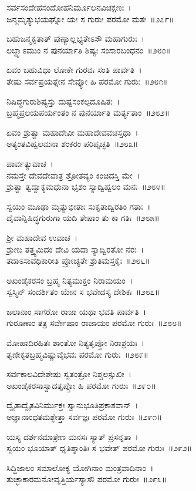 ಸರ್ವಸಂದೇಹಸಂದೋಹನಿರ್ಮೂಲನವಿಚಕ್ಷಣಃ~।\\
ಜನ್ಮಮೃತ್ಯುಭಯಘ್ನೋ ಯಃ ಸ ಗುರುಃ ಪರಮೋ ಮತಃ~॥೨೭೯॥

ಬಹುಜನ್ಮಕೃತಾತ್ ಪುಣ್ಯಾಲ್ಲಭ್ಯತೇಽಸೌ ಮಹಾಗುರುಃ~।\\
ಲಬ್ಧ್ವಾಽಮುಂ ನ ಪುನರ್ಯಾತಿ ಶಿಷ್ಯಃ ಸಂಸಾರಬಂಧನಂ~॥೨೮೦॥

ಏವಂ ಬಹುವಿಧಾ ಲೋಕೇ ಗುರವಃ ಸಂತಿ ಪಾರ್ವತಿ~।\\
ತೇಷು ಸರ್ವಪ್ರಯತ್ನೇನ ಸೇವ್ಯೋ ಹಿ ಪರಮೋ ಗುರುಃ~॥೨೮೧॥

ನಿಷಿದ್ಧಗುರುಶಿಷ್ಯಸ್ತು ದುಷ್ಟಸಂಕಲ್ಪದೂಷಿತಃ~।\\
ಬ್ರಹ್ಮಪ್ರಲಯಪರ್ಯಂತಂ ನ ಪುನರ್ಯಾತಿ ಮರ್ತ್ಯತಾಂ~॥೨೮೨॥

ಏವಂ ಶ್ರುತ್ವಾ ಮಹಾದೇವೀ ಮಹಾದೇವವಚಸ್ತಥಾ~।\\
ಅತ್ಯಂತವಿಹ್ವಲಮನಾ ಶಂಕರಂ ಪರಿಪೃಚ್ಛತಿ~॥೨೮೩॥

ಪಾರ್ವತ್ಯುವಾಚ~।\\
ನಮಸ್ತೇ ದೇವದೇವಾತ್ರ ಶ್ರೋತವ್ಯಂ ಕಿಂಚಿದಸ್ತಿ ಮೇ~।\\
ಶ್ರುತ್ವಾ ತ್ವದ್ವಾಕ್ಯಮಧುನಾ ಭೃಶಂ ಸ್ಯಾದ್ವಿಹ್ವಲಂ ಮನಃ~॥೨೮೪॥

ಸ್ವಯಂ ಮೂಢಾ ಮೃತ್ಯುಭೀತಾಃ ಸುಕೃತಾದ್ವಿರತಿಂ ಗತಾಃ~।\\
ದೈವಾನ್ನಿಷಿದ್ಧಗುರುಗಾ ಯದಿ ತೇಷಾಂ ತು ಕಾ ಗತಿಃ~॥೨೮೫॥

ಶ್ರೀ ಮಹಾದೇವ ಉವಾಚ~।\\
ಶ್ರುಣು ತತ್ತ್ವಮಿದಂ ದೇವಿ ಯದಾ ಸ್ಯಾದ್ವಿರತೋ ನರಃ~।\\
ತದಾಽಸಾವಧಿಕಾರೀತಿ ಪ್ರೋಚ್ಯತೇ ಶ್ರುತಿಮಸ್ತಕೈಃ~॥೨೮೬॥

ಅಖಂಡೈಕರಸಂ ಬ್ರಹ್ಮ ನಿತ್ಯಮುಕ್ತಂ ನಿರಾಮಯಂ~।\\
ಸ್ವಸ್ಮಿನ್ ಸಂದರ್ಶಿತಂ ಯೇನ ಸ ಭವೇದಸ್ಯ ದೇಶಿಕಃ~॥೨೮೭॥

ಜಲಾನಾಂ ಸಾಗರೋ ರಾಜಾ ಯಥಾ ಭವತಿ ಪಾರ್ವತಿ~।\\
ಗುರೂಣಾಂ ತತ್ರ ಸರ್ವೇಷಾಂ ರಾಜಾಯಂ ಪರಮೋ ಗುರುಃ~॥೨೮೮॥

ಮೋಹಾದಿರಹಿತಃ ಶಾಂತೋ ನಿತ್ಯತೃಪ್ತೋ ನಿರಾಶ್ರಯಃ~।\\
ತೃಣೀಕೃತಬ್ರಹ್ಮವಿಷ್ಣುವೈಭವಃ ಪರಮೋ ಗುರುಃ~॥೨೮೯॥

ಸರ್ವಕಾಲವಿದೇಶೇಷು ಸ್ವತಂತ್ರೋ ನಿಶ್ಚಲಸ್ಸುಖೀ~।\\
ಅಖಂಡೈಕರಸಾಸ್ವಾದತೃಪ್ತೋ ಹಿ ಪರಮೋ ಗುರುಃ~॥೨೯೦॥

ದ್ವೈತಾದ್ವೈತವಿನಿರ್ಮುಕ್ತಃ ಸ್ವಾನುಭೂತಿಪ್ರಕಾಶವಾನ್~।\\
ಅಜ್ಞಾನಾಂಧತಮಶ್ಛೇತ್ತಾ ಸರ್ವಜ್ಞಃ ಪರಮೋ ಗುರುಃ~॥೨೯೧॥

ಯಸ್ಯ ದರ್ಶನಮಾತ್ರೇಣ ಮನಸಃ ಸ್ಯಾತ್ ಪ್ರಸನ್ನತಾ~।\\
ಸ್ವಯಂ ಭೂಯಾತ್ ಧೃತಿಶ್ಶಾಂತಿಃ ಸ ಭವೇತ್ ಪರಮೋ ಗುರುಃ~॥೨೯೨॥

ಸಿದ್ಧಿಜಾಲಂ ಸಮಾಲೋಕ್ಯ ಯೋಗಿನಾಂ ಮಂತ್ರವಾದಿನಾಂ~।\\
ತುಚ್ಛಾಕಾರಮನೋವೃತ್ತಿರ್ಯಸ್ಯಾಸೌ ಪರಮೋ ಗುರುಃ~॥೨೯೩॥

